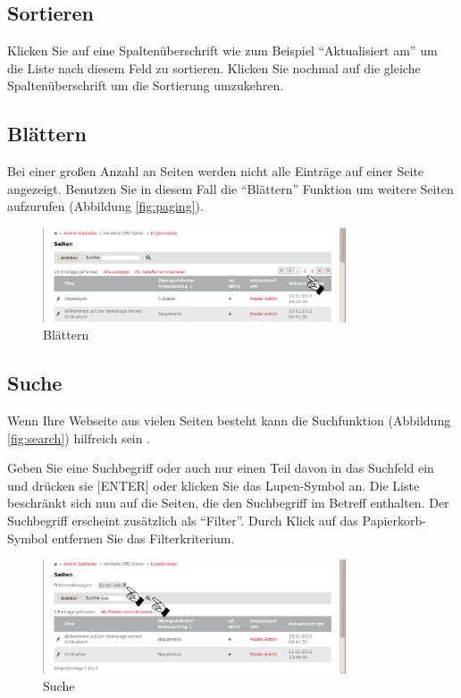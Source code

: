 \documentclass[article, a4paper, oneside, 11pt]{memoir}
\begin{document}
\subsection{Sortieren}

Klicken Sie auf eine Spaltenüberschrift wie zum Beispiel "`Aktualisiert am"' um die Liste nach diesem Feld zu sortieren. Klicken Sie nochmal auf die gleiche Spaltenüberschrift um die Sortierung umzukehren.


\subsection{Blättern}

Bei einer großen Anzahl an Seiten werden nicht alle Einträge auf einer Seite angezeigt. Benutzen Sie in diesem Fall die "`Blättern"' Funktion um weitere Seiten aufzurufen (Abbildung \vref{fig:paging}).

\begin{figure}[htp]
\centering
\includegraphics[width=0.8\textwidth]{paging}
\caption{Blättern}
\label{fig:paging}
\end{figure}


\subsection{Suche}

Wenn Ihre Webseite aus vielen Seiten besteht kann die Suchfunktion (Abbildung \vref{fig:search}) hilfreich sein .

Geben Sie eine Suchbegriff oder auch nur einen Teil davon in das Suchfeld ein und drücken sie [ENTER] oder klicken Sie das Lupen-Symbol an.
Die Liste beschränkt sich nun auf die Seiten, die den Suchbegriff im Betreff enthalten. Der Suchbegriff erscheint zusätzlich als "`Filter"'. Durch Klick auf das Papierkorb-Symbol entfernen Sie das Filterkriterium.

\begin{figure}[htp]
\centering
\includegraphics[width=0.8\textwidth]{search}
\caption{Suche}
\label{fig:search}
\end{figure}
\end{document}
